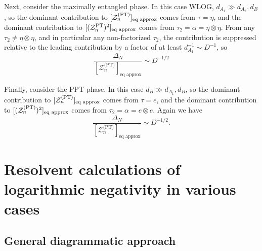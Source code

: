\documentclass[a4paper,11pt]{article}
\newcommand{\be}{\begin{equation}}
\newcommand{\ee}{\end{equation}}
\newcommand\sZ{{\mathcal Z}}
\begin{document}
\begin{enumerate}
\begin{appendix}
Next, consider the maximally entangled phase. In this case WLOG, $d_{A_1}\gg d_{A_2}, d_{B}$, so the dominant contribution to $[\sZ_n^{\rm (PT)}]_{\text{eq approx}}$ comes from $\tau= \eta$, and the dominant contribution to $[(\sZ_n^{\rm PT})^2]_{\text{eq approx}}$ comes from $\tau_2= \alpha = \eta \otimes \eta$. From any $\tau_2 \neq \eta \otimes \eta$, and in particular any non-factorized $\tau_2$, the contribution is suppressed relative to the leading contribution by a factor of at least $d_{A_1}^{-1} \sim D^{-1}$, so 
\be 
\frac{\Delta_N}{[\sZ_n^{\text{(PT)}}]_{\text{eq approx}}}\sim D^{-1/2}
\ee

Finally, consider the PPT phase. In this case $d_B \gg d_{A_1}, d_B$, so the dominant contribution to $[\sZ_n^{\rm (PT)}]_{\text{eq approx}}$ comes from $\tau= e$, and the dominant contribution to $[(\sZ_n^{\rm (PT)})^2]_{\text{eq approx}}$ comes from $\tau_2= \alpha = e \otimes e$. Again we have 
\be 
\frac{\Delta_N}{[\sZ_n^{\text{(PT)}}]_{\text{eq approx}}}\sim D^{-1/2}. 
\ee


\section{Resolvent calculations of logarithmic negativity in various cases} \label{app:resol}

\subsection{General diagrammatic approach}


\end{appendix}
\end{enumerate}
\end{document}
